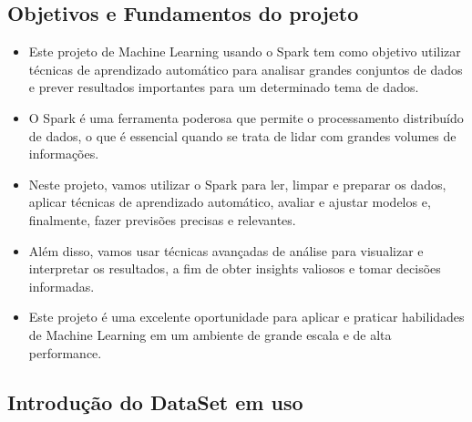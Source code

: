 \documentclass[11pt]{article}
\providecommand{\tightlist}{%
      \setlength{\itemsep}{0pt}\setlength{\parskip}{0pt}}
\begin{document}
    \hypertarget{objetivos-e-fundamentos-do-projeto}{%
\subsection{Objetivos e Fundamentos do
projeto}\label{objetivos-e-fundamentos-do-projeto}}

    \begin{itemize}
\tightlist
\item
  Este projeto de Machine Learning usando o Spark tem como objetivo
  utilizar técnicas de aprendizado automático para analisar grandes
  conjuntos de dados e prever resultados importantes para um determinado
  tema de dados.
\item
  O Spark é uma ferramenta poderosa que permite o processamento
  distribuído de dados, o que é essencial quando se trata de lidar com
  grandes volumes de informações.
\item
  Neste projeto, vamos utilizar o Spark para ler, limpar e preparar os
  dados, aplicar técnicas de aprendizado automático, avaliar e ajustar
  modelos e, finalmente, fazer previsões precisas e relevantes.
\item
  Além disso, vamos usar técnicas avançadas de análise para visualizar e
  interpretar os resultados, a fim de obter insights valiosos e tomar
  decisões informadas.
\item
  Este projeto é uma excelente oportunidade para aplicar e praticar
  habilidades de Machine Learning em um ambiente de grande escala e de
  alta performance.
\end{itemize}

    \hypertarget{introduuxe7uxe3o-do-dataset-em-uso}{%
\subsection{Introdução do DataSet em
uso}\label{introduuxe7uxe3o-do-dataset-em-uso}}
\end{document}
